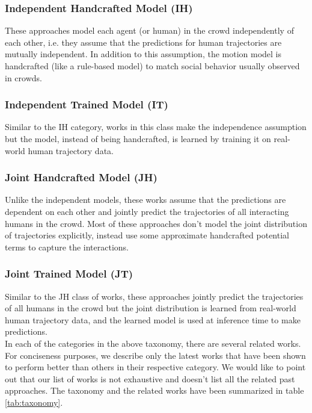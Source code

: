 \subsubsection{Independent Handcrafted Model (IH)}
\label{sec:indep-handcr-model}

These approaches model each agent (or human) in the crowd independently of each other, i.e. they assume that the predictions for human trajectories are mutually independent. In addition to this assumption, the motion model is handcrafted (like a rule-based model) to match social behavior usually observed in crowds.

\subsubsection{Independent Trained Model (IT)}
\label{sec:indep-train-model}

Similar to the IH category, works in this class make the independence assumption but the model, instead of being handcrafted, is learned by training it on real-world human trajectory data.

\subsubsection{Joint Handcrafted Model (JH)}
\label{sec:joint-handcr-model}

Unlike the independent models, these works assume that the predictions are dependent on each other and jointly predict the trajectories of all interacting humans in the crowd. Most of these approaches don't model the joint distribution of trajectories explicitly, instead use some approximate handcrafted potential terms to capture the interactions.

\subsubsection{Joint Trained Model (JT)}
\label{sec:joint-trained-model}

Similar to the JH class of works, these approaches jointly predict the trajectories of all humans in the crowd but the joint distribution is learned from real-world human trajectory data, and the learned model is used at inference time to make predictions. \\




In each of the categories in the above taxonomy, there are several related works. For conciseness purposes, we describe only the latest works that have been shown to perform better than others in their respective category. We would like to point out that our list of works is not exhaustive and doesn't list all the related past approaches. The taxonomy and the related works have been summarized in table \ref{tab:taxonomy}.

